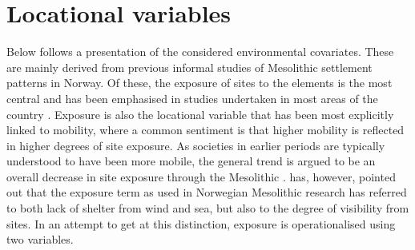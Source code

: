 \documentclass[12pt, a4paper]{article}
\begin{document}
\section{Locational variables}
Below follows a presentation of the considered environmental covariates. These are mainly derived from previous informal studies of Mesolithic settlement patterns in Norway. Of these, the exposure of sites to the elements is the most central and has been emphasised in studies undertaken in most areas of the country \citep[][]{bjerck2008, berghansen2009, aastveit2014}. Exposure is also the locational variable that has been most explicitly linked to mobility, where a common sentiment is that higher mobility is reflected in higher degrees of site exposure. As societies in earlier periods are typically understood to have been more mobile, the general trend is argued to be an overall decrease in site exposure through the Mesolithic \citep[e.g.][]{lindblom1984, jaksland2001, bjerck2008, breivik2018}. \cite{svendsen2014} has, however, pointed out that the exposure term as used in Norwegian Mesolithic research has referred to both lack of shelter from wind and sea, but also to the degree of visibility from sites. In an attempt to get at this distinction, exposure is operationalised using two variables. \par
\end{document}
